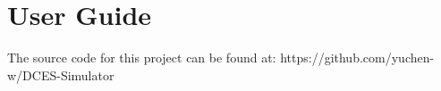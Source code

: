 \chapter{User Guide}
\label{Guide}

The source code for this project can be found at: https://github.com/yuchen-w/DCES-Simulator